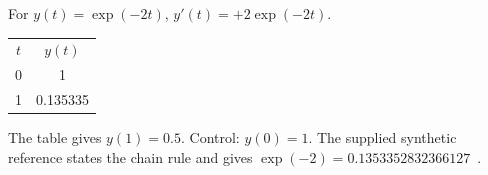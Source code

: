 For $y(t)=\exp(-2t)$, $y'(t)=+2\exp(-2t)$.
\begin{tabular}{cc}$t$ & $y(t)$\\0 & 1\\1 & 0.135335\end{tabular}
The table gives $y(1)=0.5$.
Control: $y(0)=1$.
The supplied synthetic reference states the chain rule and gives
$\exp(-2)=0.1353352832366127$~\cite{fixture}.
